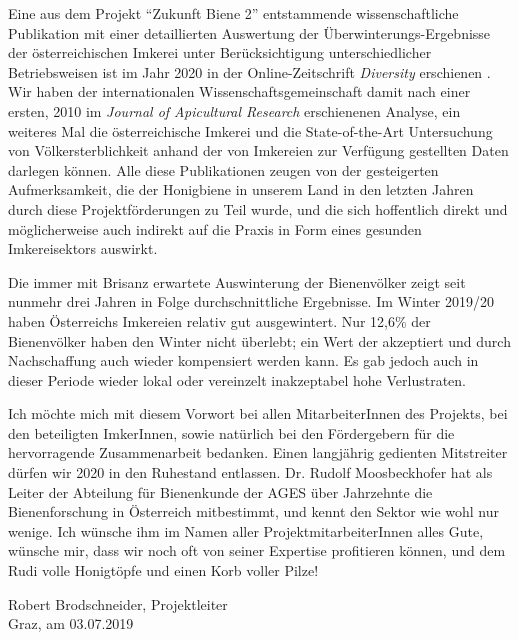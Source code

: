 Eine aus dem Projekt \enquote{Zukunft Biene 2} entstammende wissenschaftliche Publikation mit einer detaillierten Auswertung der Überwinterungs-Ergebnisse der österreichischen Imkerei unter
Berücksichtigung unterschiedlicher Betriebsweisen ist im Jahr 2020 in der Online-Zeitschrift \textit{Diversity} erschienen \citep{oberreiter2020}. Wir haben der internationalen Wissenschaftsgemeinschaft damit nach einer ersten, 2010 im \textit{Journal of Apicultural Research} erschienenen Analyse, ein weiteres Mal die österreichische Imkerei und die State-of-the-Art Untersuchung von Völkersterblichkeit anhand der
von Imkereien zur Verfügung gestellten Daten darlegen können. Alle diese Publikationen zeugen von der gesteigerten Aufmerksamkeit, die der Honigbiene in unserem Land in den letzten Jahren durch diese Projektförderungen zu Teil wurde, und die sich hoffentlich direkt und möglicherweise auch indirekt auf die Praxis in Form eines gesunden Imkereisektors auswirkt.

Die immer mit Brisanz erwartete Auswinterung der Bienenvölker zeigt seit nunmehr drei Jahren in Folge
durchschnittliche Ergebnisse. Im Winter 2019/20 haben Österreichs Imkereien relativ gut ausgewintert. Nur 12,6\% der Bienenvölker haben den Winter nicht überlebt; ein Wert der akzeptiert und durch Nachschaffung auch wieder kompensiert werden kann. Es gab jedoch auch in dieser Periode wieder lokal oder
vereinzelt inakzeptabel hohe Verlustraten.

Ich möchte mich mit diesem Vorwort bei allen MitarbeiterInnen des Projekts, bei den beteiligten ImkerInnen, sowie natürlich bei den Fördergebern für die hervorragende Zusammenarbeit bedanken.
Einen langjährig gedienten Mitstreiter dürfen wir 2020 in den Ruhestand entlassen. Dr. Rudolf Moosbeckhofer hat als Leiter der Abteilung für Bienenkunde der AGES über Jahrzehnte die Bienenforschung in Österreich mitbestimmt, und kennt den Sektor wie wohl nur wenige. Ich wünsche ihm im Namen aller
ProjektmitarbeiterInnen alles Gute, wünsche mir, dass wir noch oft von seiner Expertise profitieren können, und dem Rudi volle Honigtöpfe und einen Korb voller Pilze!

\begin{flushright}
    Robert Brodschneider, Projektleiter \\
    Graz, am 03.07.2019
\end{flushright}